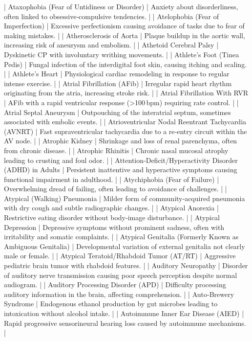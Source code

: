 | Ataxophobia (Fear of Untidiness or Disorder) | Anxiety about disorderliness, often linked to obsessive‑compulsive tendencies. |
| Atelophobia (Fear of Imperfection) | Excessive perfectionism causing avoidance of tasks due to fear of making mistakes. |
| Atherosclerosis of Aorta | Plaque buildup in the aortic wall, increasing risk of aneurysm and embolism. |
| Athetoid Cerebral Palsy | Dyskinetic CP with involuntary writhing movements. |
| Athlete’s Foot (Tinea Pedis) | Fungal infection of the interdigital foot skin, causing itching and scaling. |
| Athlete’s Heart | Physiological cardiac remodeling in response to regular intense exercise. |
| Atrial Fibrillation (AFib) | Irregular rapid heart rhythm originating from the atria, increasing stroke risk. |
| Atrial Fibrillation With RVR | AFib with a rapid ventricular response (>100 bpm) requiring rate control. |
| Atrial Septal Aneurysm | Outpouching of the interatrial septum, sometimes associated with embolic events. |
| Atrioventricular Nodal Reentrant Tachycardia (AVNRT) | Fast supraventricular tachycardia due to a re‑entry circuit within the AV node. |
| Atrophic Kidney | Shrinkage and loss of renal parenchyma, often from chronic disease. |
| Atrophic Rhinitis | Chronic nasal mucosal atrophy leading to crusting and foul odor. |
| Attention‑Deficit/Hyperactivity Disorder (ADHD) in Adults | Persistent inattentive and hyperactive symptoms causing functional impairment in adulthood. |
| Atychiphobia (Fear of Failure) | Overwhelming dread of failing, often leading to avoidance of challenges. |
| Atypical (Walking) Pneumonia | Milder form of community‑acquired pneumonia with dry cough and subtle radiographic changes. |
| Atypical Anorexia | Restrictive eating disorder without body‑image disturbance. |
| Atypical Depression | Depressive symptoms without prominent sadness, often with irritability and somatic complaints. |
| Atypical Genitalia (Formerly Known as Ambiguous Genitalia) | Developmental variation of external genitalia not clearly male or female. |
| Atypical Teratoid/Rhabdoid Tumor (AT/RT) | Aggressive pediatric brain tumor with rhabdoid features. |
| Auditory Neuropathy | Disorder of auditory nerve transmission causing poor speech perception despite normal audiogram. |
| Auditory Processing Disorder (APD) | Difficulty processing auditory information in the brain, affecting comprehension. |
| Auto‑Brewery Syndrome | Endogenous ethanol production by gut microbes leading to intoxication without alcohol intake. |
| Autoimmune Inner Ear Disease (AIED) | Rapid progressive sensorineural hearing loss caused by autoimmune mechanisms. |

